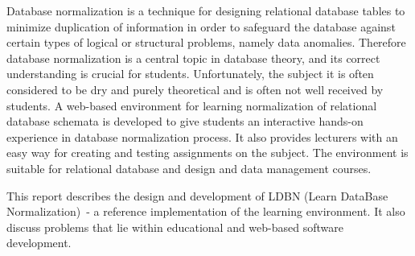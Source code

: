 Database normalization is a technique for designing relational database tables 
to minimize duplication of information in order to safeguard the database 
against certain types of logical or structural problems, namely data anomalies. 
Therefore database normalization is a central topic in database theory, and its 
correct understanding is crucial for students. Unfortunately,  the subject it is 
often considered to be dry and purely theoretical and is often not well received  by students. 
A web-based environment for learning normalization of
relational database schemata is developed to give 
students an interactive hands-on experience in database normalization process. It
also provides lecturers with an easy way for creating and testing assignments 
on the subject.  
The environment is suitable for relational database and design and data 
management courses. 

This report describes the design and development of LDBN 
(Learn DataBase Normalization)~- a reference implementation of the learning environment.
It also discuss problems that lie within educational and web-based software development.
